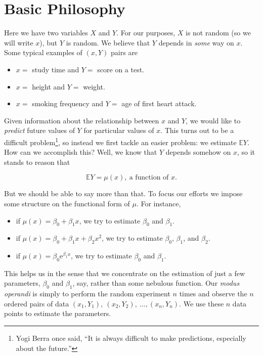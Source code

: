\documentclass[]{book}
\providecommand{\tightlist}{%
  \setlength{\itemsep}{0pt}\setlength{\parskip}{0pt}}
\let\rmarkdownfootnote\footnote%
\def\footnote{\protect\rmarkdownfootnote}
\numberwithin{equation}{chapter}
\numberwithin{figure}{chapter}
\theoremstyle{plain}
\theoremstyle{definition}
\theoremstyle{remark}
\theoremstyle{definition}
\theoremstyle{definition}
\theoremstyle{remark}
\begin{document}
\section{Basic Philosophy}\label{sec-basic-philosophy}

Here we have two variables \(X\) and \(Y\). For our purposes, \(X\) is
not random (so we will write \(x\)), but \(Y\) is random. We believe
that \(Y\) depends in \emph{some} way on \(x\). Some typical examples of
\((x,Y)\) pairs are

\begin{itemize}
\tightlist
\item
  \(x =\) study time and \(Y =\) score on a test.
\item
  \(x =\) height and \(Y =\) weight.
\item
  \(x =\) smoking frequency and \(Y =\) age of first heart attack.
\end{itemize}

Given information about the relationship between \(x\) and \(Y\), we
would like to \emph{predict} future values of \(Y\) for particular
values of \(x\). This turns out to be a difficult problem\footnote{Yogi
  Berra once said, ``It is always difficult to make predictions,
  especially about the future.''}, so instead we first tackle an easier
problem: we estimate \(\mathbb{E}Y\). How can we accomplish this? Well,
we know that \(Y\) depends somehow on \(x\), so it stands to reason that

\begin{equation}
\mathbb{E} Y = \mu(x),\ \mbox{a function of }x.
\end{equation}

But we should be able to say more than that. To focus our efforts we
impose some structure on the functional form of \(\mu\). For instance,

\begin{itemize}
\tightlist
\item
  if \(\mu(x)=\beta_{0}+\beta_{1}x\), we try to estimate \(\beta_{0}\)
  and \(\beta_{1}\).
\item
  if \(\mu(x) = \beta_{0} + \beta_{1}x + \beta_{2}x^{2}\), we try to
  estimate \(\beta_{0}\), \(\beta_{1}\), and \(\beta_{2}\).
\item
  if \(\mu(x) = \beta_{0} \mathrm{e}^{\beta_{1}x}\), we try to estimate
  \(\beta_{0}\) and \(\beta_{1}\).
\end{itemize}

This helps us in the sense that we concentrate on the estimation of just
a few parameters, \(\beta_{0}\) and \(\beta_{1}\), say, rather than some
nebulous function. Our \emph{modus operandi} is simply to perform the
random experiment \(n\) times and observe the \(n\) ordered pairs of
data \((x_{1},Y_{1}),\ (x_{2},Y_{2}),\ \ldots,(x_{n},Y_{n})\). We use
these \(n\) data points to estimate the parameters.
\end{document}
